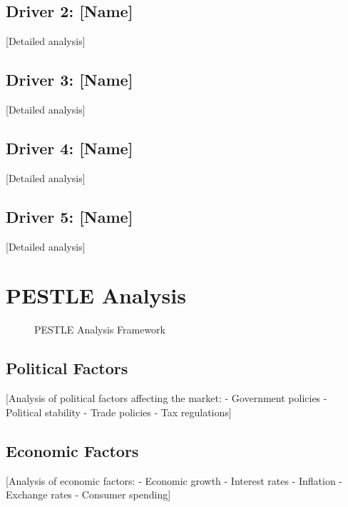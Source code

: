 \documentclass[11pt,letterpaper]{report}
\begin{document}
\subsection{Driver 2: [Name]}
[Detailed analysis]

\subsection{Driver 3: [Name]}
[Detailed analysis]

\subsection{Driver 4: [Name]}
[Detailed analysis]

\subsection{Driver 5: [Name]}
[Detailed analysis]

\section{PESTLE Analysis}


\begin{figure}[htbp]
\centering
\caption{PESTLE Analysis Framework}
\label{fig:pestle}
\end{figure}

\subsection{Political Factors}
[Analysis of political factors affecting the market:
- Government policies
- Political stability
- Trade policies
- Tax regulations]

\subsection{Economic Factors}
[Analysis of economic factors:
- Economic growth
- Interest rates
- Inflation
- Exchange rates
- Consumer spending]
\end{document}
